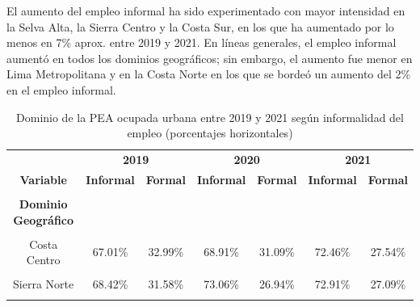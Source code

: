 \documentclass[
  letterpaper,
  12pt,
  oneside,
  spanish,
  doublespacing,
  headsepline,
  parskip]{MastersDoctoralThesis}
\begin{document}
El aumento del empleo informal ha sido experimentado con mayor
intensidad en la Selva Alta, la Sierra Centro y la Costa Sur, en los que
ha aumentado por lo menos en 7\% aprox. entre 2019 y 2021. En líneas
generales, el empleo informal aumentó en todos los dominios geográficos;
sin embargo, el aumento fue menor en Lima Metropolitana y en la Costa
Norte en los que se bordeó un aumento del 2\% en el empleo informal.

\hypertarget{tbl-dominio}{}
\begin{table}[H]
\caption{\label{tbl-dominio}Dominio de la PEA ocupada urbana entre 2019 y 2021 según informalidad
del empleo (porcentajes horizontales) }\tabularnewline

\centering\begingroup\fontsize{10}{12}\selectfont

\begin{tabular}{ccccccc}
\toprule
\multicolumn{1}{c}{ } & \multicolumn{2}{c}{\textbf{2019}} & \multicolumn{2}{c}{\textbf{2020}} & \multicolumn{2}{c}{\textbf{2021}} \\
\cmidrule(l{3pt}r{3pt}){2-3} \cmidrule(l{3pt}r{3pt}){4-5} \cmidrule(l{3pt}r{3pt}){6-7}
\textbf{Variable} & \textbf{Informal} & \textbf{Formal} & \textbf{Informal} & \textbf{Formal} & \textbf{Informal} & \textbf{Formal}\\
\midrule
\cellcolor{gray!6}{\textbf{Nacional}} & \cellcolor{gray!6}{66.40\%} & \cellcolor{gray!6}{33.60\%} & \cellcolor{gray!6}{68.42\%} & \cellcolor{gray!6}{31.58\%} & \cellcolor{gray!6}{71.41\%} & \cellcolor{gray!6}{28.59\%}\\
\textbf{Dominio Geográfico} &  &  &  &  &  & \\
\cellcolor{gray!6}{Costa Norte} & \cellcolor{gray!6}{72.53\%} & \cellcolor{gray!6}{27.47\%} & \cellcolor{gray!6}{72.42\%} & \cellcolor{gray!6}{27.58\%} & \cellcolor{gray!6}{74.56\%} & \cellcolor{gray!6}{25.44\%}\\
Costa Centro & 67.01\% & 32.99\% & 68.91\% & 31.09\% & 72.46\% & 27.54\%\\
\cellcolor{gray!6}{Costa Sur} & \cellcolor{gray!6}{68.12\%} & \cellcolor{gray!6}{31.88\%} & \cellcolor{gray!6}{67.92\%} & \cellcolor{gray!6}{32.08\%} & \cellcolor{gray!6}{73.02\%} & \cellcolor{gray!6}{26.98\%}\\
\addlinespace
Sierra Norte & 68.42\% & 31.58\% & 73.06\% & 26.94\% & 72.91\% & 27.09\%\\
\cellcolor{gray!6}{Sierra Centro} & \cellcolor{gray!6}{73.02\%} & \cellcolor{gray!6}{26.98\%} & \cellcolor{gray!6}{75.78\%} & \cellcolor{gray!6}{24.22\%} & \cellcolor{gray!6}{80.20\%} & \cellcolor{gray!6}{19.80\%}\\

\end{tabular}
\end{table}
\end{document}

